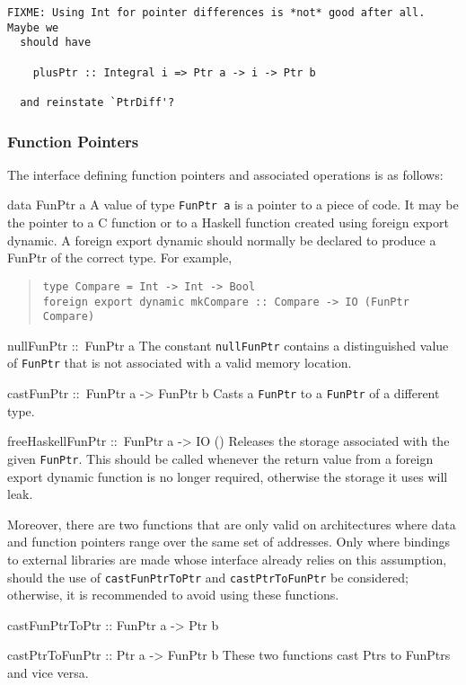 \documentclass[a4paper,twosides]{article}
\makeatletter
\newcommand{\code}[1]{\texttt{#1}}      %
\newenvironment{codedesc}{%
  \list{}{\labelwidth\z@ \itemindent-\leftmargin
    \let\makelabel\codedesclabel}
  }{%
  \endlist
  }
\newcommand*{\codedesclabel}[1]{\hspace\labelsep\normalfont\code{#1}}
\makeatother
\begin{document}
\begin{verbatim}
FIXME: Using Int for pointer differences is *not* good after all.  Maybe we
  should have

    plusPtr :: Integral i => Ptr a -> i -> Ptr b

  and reinstate `PtrDiff'?
\end{verbatim}

\subsubsection{Function Pointers}

The interface defining function pointers and associated operations is as
follows:
%
\begin{codedesc}
\item[data FunPtr a] A value of type \code{FunPtr a} is a pointer to a piece
  of code. It may be the pointer to a C function or to a Haskell function
  created using foreign export dynamic. A foreign export dynamic should
  normally be declared to produce a FunPtr of the correct type. For example,
  \begin{quote}
\begin{verbatim}
type Compare = Int -> Int -> Bool
foreign export dynamic mkCompare :: Compare -> IO (FunPtr Compare)
\end{verbatim}
  \end{quote}
\item[nullFunPtr ::\ FunPtr a] The constant \code{nullFunPtr} contains a
  distinguished value of \code{FunPtr} that is not associated with a valid
  memory location.
\item[castFunPtr ::\ FunPtr a -> FunPtr b] Casts a \code{FunPtr} to a
  \code{FunPtr} of a different type.
\item[freeHaskellFunPtr ::\ FunPtr a -> IO ()] Releases the storage associated
  with the given \code{FunPtr}. This should be called whenever the return
  value from a foreign export dynamic function is no longer required,
  otherwise the storage it uses will leak.
\end{codedesc}

Moreover, there are two functions that are only valid on architectures where
data and function pointers range over the same set of addresses.  Only where
bindings to external libraries are made whose interface already relies on this
assumption, should the use of \code{castFunPtrToPtr} and
\code{castPtrToFunPtr} be considered; otherwise, it is recommended to avoid
using these functions.
%
\begin{codedesc}
\item[castFunPtrToPtr :: FunPtr a -> Ptr b]
\item[castPtrToFunPtr :: Ptr a -> FunPtr b] These two functions cast Ptrs to
  FunPtrs and vice versa.
\end{codedesc}
\end{document}
